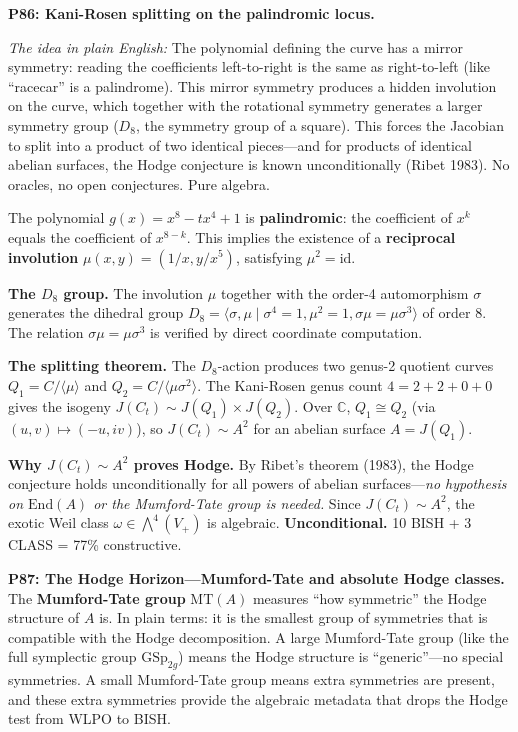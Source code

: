 \documentclass[11pt,twoside,openany]{report}
\theoremstyle{remark}
\newcommand{\BISH}{\textsf{BISH}}
\newcommand{\WLPO}{\textsf{WLPO}}
\newcommand{\CLASS}{\textsf{CLASS}}
\begin{document}
\textbf{P86: Kani-Rosen splitting on the palindromic locus.}

\emph{The idea in plain English:} The polynomial defining the curve has a mirror symmetry: reading the coefficients left-to-right is the same as right-to-left (like ``racecar'' is a palindrome). This mirror symmetry produces a hidden involution on the curve, which together with the rotational symmetry generates a larger symmetry group ($D_8$, the symmetry group of a square). This forces the Jacobian to split into a product of two identical pieces---and for products of identical abelian surfaces, the Hodge conjecture is known unconditionally (Ribet 1983). No oracles, no open conjectures. Pure algebra.

The polynomial $g(x) = x^8 - tx^4 + 1$ is \textbf{palindromic}: the coefficient of $x^k$ equals the coefficient of $x^{8-k}$. This implies the existence of a \textbf{reciprocal involution} $\mu(x,y) = (1/x, y/x^5)$, satisfying $\mu^2 = \mathrm{id}$.

\textbf{The $D_8$ group.} The involution $\mu$ together with the order-4 automorphism $\sigma$ generates the dihedral group $D_8 = \langle \sigma, \mu \mid \sigma^4 = 1, \mu^2 = 1, \sigma\mu = \mu\sigma^3 \rangle$ of order 8. The relation $\sigma\mu = \mu\sigma^3$ is verified by direct coordinate computation.

\textbf{The splitting theorem.} The $D_8$-action produces two genus-2 quotient curves $Q_1 = C/\langle\mu\rangle$ and $Q_2 = C/\langle\mu\sigma^2\rangle$. The Kani-Rosen genus count $4 = 2 + 2 + 0 + 0$ gives the isogeny $J(C_t) \sim J(Q_1) \times J(Q_2)$. Over $\mathbb{C}$, $Q_1 \cong Q_2$ (via $(u,v) \mapsto (-u, iv)$), so $J(C_t) \sim A^2$ for an abelian surface $A = J(Q_1)$.

\textbf{Why $J(C_t) \sim A^2$ proves Hodge.} By Ribet's theorem (1983), the Hodge conjecture holds unconditionally for all powers of abelian surfaces---\emph{no hypothesis on $\mathrm{End}(A)$ or the Mumford-Tate group is needed.} Since $J(C_t) \sim A^2$, the exotic Weil class $\omega \in \bigwedge^4(V_+)$ is algebraic. \textbf{Unconditional.} 10 \BISH{} + 3 \CLASS{} = 77\% constructive.

\textbf{P87: The Hodge Horizon---Mumford-Tate and absolute Hodge classes.}
The \textbf{Mumford-Tate group} $\mathrm{MT}(A)$ measures ``how symmetric'' the Hodge structure of $A$ is. In plain terms: it is the smallest group of symmetries that is compatible with the Hodge decomposition. A large Mumford-Tate group (like the full symplectic group $\mathrm{GSp}_{2g}$) means the Hodge structure is ``generic''---no special symmetries. A small Mumford-Tate group means extra symmetries are present, and these extra symmetries provide the algebraic metadata that drops the Hodge test from \WLPO{} to \BISH.
\end{document}
